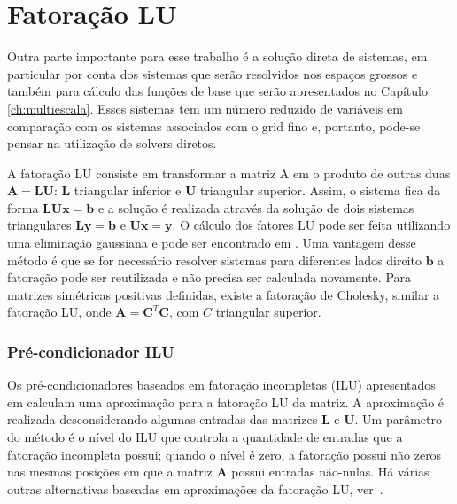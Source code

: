 
\section{Fatoração LU} \label{sec:fatoracaolu}

Outra parte importante para esse trabalho é a solução direta de sistemas, em particular por conta dos sistemas que serão resolvidos nos espaços grossos e também para cálculo das funções de base que serão apresentados no Capítulo \ref{ch:multiescala}. Esses sistemas tem um número reduzido de variáveis em comparação com os sistemas associados com o grid fino e, portanto, pode-se pensar na utilização de solvers diretos.

A fatoração LU consiste em transformar a matriz A em o produto de outras duas $\mathbf{A}=\mathbf{L}\mathbf{U}$: $\mathbf{L}$ triangular inferior e $\mathbf{U}$ triangular superior. Assim, o sistema fica da forma $\mathbf{L} \mathbf{U} \mathbf{x} = \mathbf{b}$ e a solução é realizada através da solução de dois sistemas triangulares $\mathbf{L}\mathbf{y} = \mathbf{b}$ e $\mathbf{U}\mathbf{x} = \mathbf{y}$. O cálculo dos fatores LU pode ser feita utilizando uma eliminação gaussiana e pode ser encontrado em \citet{heath1997scientific}. Uma vantagem desse método é que se for necessário resolver sistemas para diferentes lados direito $\mathbf{b}$ a fatoração pode ser reutilizada e não precisa ser calculada novamente. Para matrizes simétricas positivas definidas, existe a fatoração de Cholesky, similar a fatoração LU, onde $\mathbf{A} = \mathbf{C}^T \mathbf{C}$, com $C$ triangular superior.


\subsubsection{Pré-condicionador ILU}

Os pré-condicionadores baseados em fatoração incompletas (ILU) apresentados em \citet{ilupaper}  calculam uma aproximação para a fatoração LU da matriz. A aproximação é realizada desconsiderando algumas entradas das matrizes $\mathbf{L}$ e $\mathbf{U}$. Um parâmetro do método é o nível do ILU que controla a quantidade de entradas que a fatoração incompleta possui; quando o nível é  zero, a fatoração possui não zeros nas mesmas posições em que a matriz $\mathbf{A}$ possui entradas não-nulas. Há várias outras alternativas baseadas em aproximações da fatoração LU, ver~\cite{solverlinear}.

